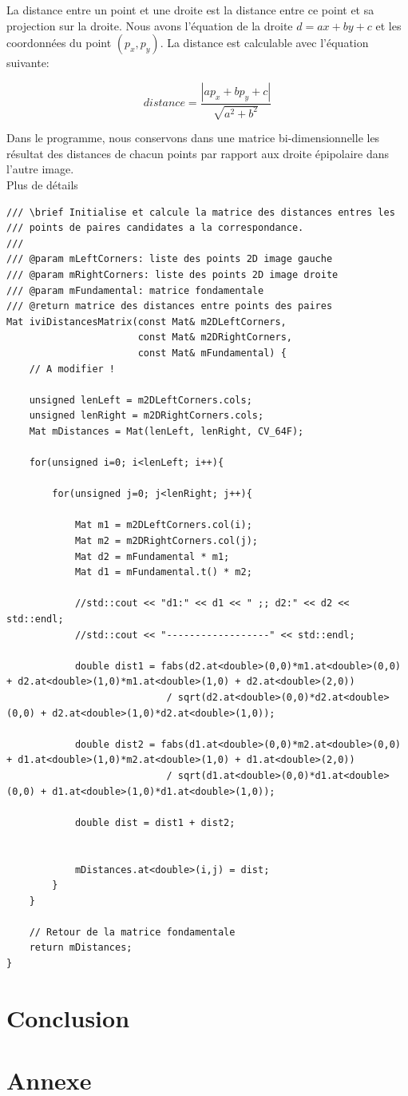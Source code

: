 \documentclass[a4paper,11pt]{article}
\begin{document}
La distance entre un point et une droite est la distance entre ce point et sa projection sur la 
droite. Nous avons l'équation de la droite $d=ax+by+c$ et les coordonnées du point $(p_x,p_y)$.
La distance est calculable avec l'équation suivante:

$$
distance = \frac{|ap_x + bp_y + c|}{\sqrt{a^2+b^2}}
$$

Dans le programme, nous conservons dans une matrice bi-dimensionnelle les résultat des distances de chacun 
points par rapport aux droite épipolaire dans l'autre image.\\

Plus de détails

\begin{lstlisting}[caption=Fontion de calcul des distances]
/// \brief Initialise et calcule la matrice des distances entres les
/// points de paires candidates a la correspondance.
///
/// @param mLeftCorners: liste des points 2D image gauche
/// @param mRightCorners: liste des points 2D image droite
/// @param mFundamental: matrice fondamentale
/// @return matrice des distances entre points des paires
Mat iviDistancesMatrix(const Mat& m2DLeftCorners,
                       const Mat& m2DRightCorners,
                       const Mat& mFundamental) {
    // A modifier !

    unsigned lenLeft = m2DLeftCorners.cols;
    unsigned lenRight = m2DRightCorners.cols;
    Mat mDistances = Mat(lenLeft, lenRight, CV_64F);

    for(unsigned i=0; i<lenLeft; i++){

        for(unsigned j=0; j<lenRight; j++){

            Mat m1 = m2DLeftCorners.col(i);
            Mat m2 = m2DRightCorners.col(j);
            Mat d2 = mFundamental * m1;
            Mat d1 = mFundamental.t() * m2;

            //std::cout << "d1:" << d1 << " ;; d2:" << d2 << std::endl;
            //std::cout << "------------------" << std::endl;

            double dist1 = fabs(d2.at<double>(0,0)*m1.at<double>(0,0) + d2.at<double>(1,0)*m1.at<double>(1,0) + d2.at<double>(2,0))
                            / sqrt(d2.at<double>(0,0)*d2.at<double>(0,0) + d2.at<double>(1,0)*d2.at<double>(1,0));

            double dist2 = fabs(d1.at<double>(0,0)*m2.at<double>(0,0) + d1.at<double>(1,0)*m2.at<double>(1,0) + d1.at<double>(2,0))
                            / sqrt(d1.at<double>(0,0)*d1.at<double>(0,0) + d1.at<double>(1,0)*d1.at<double>(1,0));

            double dist = dist1 + dist2;


            mDistances.at<double>(i,j) = dist;
        }
    }

    // Retour de la matrice fondamentale
    return mDistances;
}
\end{lstlisting}



\section{Conclusion}



\section{Annexe}
\end{document}
